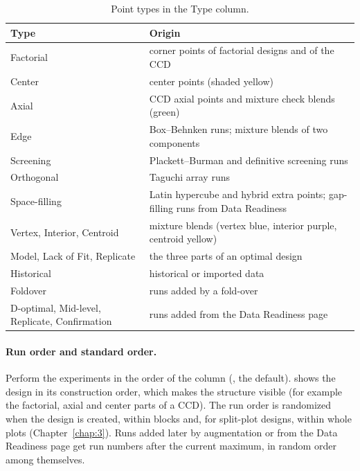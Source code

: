 \begin{table}[htbp]
\centering
\caption{Point types in the Type column.}
\label{tab:ch04-types}
\small
\begin{tabularx}{\linewidth}{@{}p{3.4cm}X@{}}
\toprule
Type & Origin \\
\midrule
Factorial & corner points of factorial designs and of the CCD \\
Center & center points (shaded yellow) \\
Axial & CCD axial points and mixture check blends (green) \\
Edge & Box--Behnken runs; mixture blends of two components \\
Screening & Plackett--Burman and definitive screening runs \\
Orthogonal & Taguchi array runs \\
Space-filling & Latin hypercube and hybrid extra points; gap-filling runs from Data Readiness \\
Vertex, Interior, Centroid & mixture blends (vertex blue, interior purple, centroid yellow) \\
Model, Lack of Fit, Replicate & the three parts of an optimal design \\
Historical & historical or imported data \\
Foldover & runs added by a fold-over \\
D-optimal, Mid-level, Replicate, Confirmation & runs added from the Data Readiness page \\
\bottomrule
\end{tabularx}
\end{table}

\paragraph{Run order and standard order.} Perform the experiments in the order of the  column
(, the default).  shows the design in its construction order, which makes the
structure visible (for example the factorial, axial and center parts of a CCD). The run order is randomized when the
design is created, within blocks and, for split-plot designs, within whole plots (Chapter~\ref{chap:3}). Runs added later by
augmentation or from the Data Readiness page get run numbers after the current maximum, in random order among
themselves.

